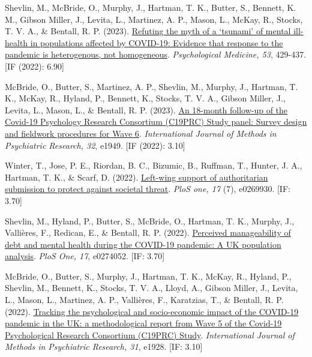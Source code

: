 \documentclass[12pt]{article}
\begin{document}
\begin{bibenum}
\item Shevlin, M., McBride, O., Murphy, J., 
		Hartman, T. K., Butter, S., Bennett, K. M., 
		Gibson Miller, J., Levita, L., Martinez, A. P., 
		Mason, L., McKay, R., Stocks, T. V. A., 
		\& Bentall, R. P. (2023). 
		\href{https://doi.org/10.1017/S0033291721001665}
		{Refuting the myth of a ‘tsunami’ of 
		mental ill-health in populations affected 
		by COVID-19: Evidence that response to the
		 pandemic is heterogenous, not homogeneous}.
		\emph{Psychological Medicine, 53}, 429-437. 
		[IF (2022): 6.90]

\item McBride, O., Butter, S., Martinez, A. P.,
	Shevlin, M., Murphy, J., Hartman, T. K., 
	McKay, R., Hyland, P., Bennett, K., 
	Stocks, T. V. A., Gibson Miller, J., Levita, L., 
	Mason, L., \& Bentall, R. P. (2023). 
	\href{https://doi.org/10.1002/mpr.1949}
	{An 18-month follow-up of the Covid-19 Psychology 
	Research Consortium (C19PRC) Study panel: Survey 
	design and fieldwork procedures for Wave 6}.  
	\emph{International Journal of Methods 
	in Psychiatric Research, 32}, e1949. 
	[IF (2022): 3.10]
	
\item Winter, T., Jose, P. E., Riordan, B. C., 
		Bizumic, B., Ruffman, T., Hunter, J. A., 
		Hartman, T. K., \& Scarf, D. (2022). 
		\href{https://doi.org/10.1371/journal.pone.0269930}
		{Left-wing support of authoritarian submission 
		to protect against societal threat}. 
		\textit{PloS one, 17} (7), e0269930. 
		[IF: 3.70]
		
\item Shevlin, M., Hyland, P., Butter, S., 
		McBride, O., Hartman, T. K., Murphy, J., 
		Vallières, F., Redican, E., 
		\& Bentall, R. P. (2022). 
		\href{https://doi.org/10.1371/journal.pone.0274052}
		{Perceived manageability of debt and mental health 
		during the COVID-19 pandemic: A UK 
		population analysis}. \textit{PloS One, 17}, 
		e0274052. [IF: 3.70]

\item McBride, O., Butter, S., Murphy, J., 
	Hartman, T. K., McKay, R., Hyland, P., 
	Shevlin, M., Bennett, K., Stocks, T. V. A., 
	Lloyd, A., Gibson Miller, J., Levita, L., 
	Mason, L., Martinez, A. P.,  
	Vallières, F., Karatzias, T., 
	\& Bentall, R. P. (2022). 
	\href{https://doi.org/10.1002/mpr.1928}
	{Tracking the psychological and socio-economic 
	impact of the COVID-19 pandemic in the UK: 
	a methodological report from Wave 5 of the 
	Covid-19 Psychological Research Consortium 
	(C19PRC) Study}.  
	\emph{International Journal of Methods 
	in Psychiatric Research, 31}, e1928. [IF: 3.10]


\end{bibenum}
\end{document}
